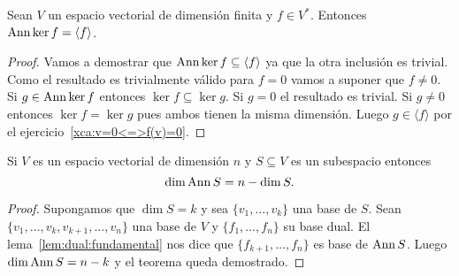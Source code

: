 \begin{prop}
	Sean $V$ un espacio vectorial de dimensión finita y $f\in V^*$. Entonces
	$\operatorname{Ann}\ker f=\langle f\rangle$.

	\begin{proof}
        Vamos a demostrar que $\operatorname{Ann}\ker f\subseteq\langle f\rangle$ ya que la
        otra inclusión es trivial.  Como el resultado es trivialmente válido para $f=0$ vamos a suponer que $f\ne0$. 
        Si $g\in\operatorname{Ann}\ker f$ entonces $\ker f\subseteq \ker g$. Si $g=0$
        el resultado es trivial. Si $g\ne 0$ entonces $\ker f=\ker g$ pues
        ambos tienen la misma dimensión. Luego $g\in\langle f\rangle$ por el
        ejercicio~\ref{xca:v=0<=>f(v)=0}.
%		
	\end{proof}
\end{prop}

\begin{thm}
	\label{thm:dimension_anulador}
	Si $V$ es un espacio vectorial de dimensión $n$ y $S\subseteq V$ es un
	subespacio entonces
	\[
		\dim\operatorname{Ann} S=n-\dim S.
	\]
	\begin{proof}
		Supongamos que $\dim S=k$ y sea $\{v_1,\dots,v_k\}$ una base de $S$.
		Sean $\{v_1,\dots,v_k,v_{k+1},\dots,v_n\}$ una base de $V$ y
		$\{f_1,\dots,f_n\}$ su base dual. El lema~\ref{lem:dual:fundamental}
		nos dice que $\{f_{k+1},\dots,f_n\}$ es base de $\operatorname{Ann} S$. Luego
		$\dim\operatorname{Ann} S=n-k$ y el teorema queda demostrado.
	\end{proof}
\end{thm}

